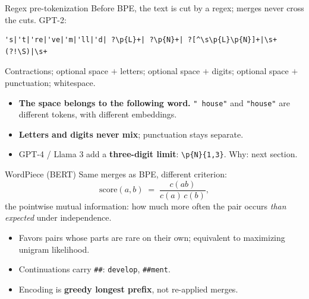 \documentclass[11pt,aspectratio=169]{beamer}
\newcommand{\dest}[1]{\textcolor{structure}{\textbf{#1}}}
\begin{document}
\begin{frame}[fragile]{Regex pre-tokenization}
  Before BPE, the text is cut by a regex; merges never cross the cuts. GPT-2:
\begin{lstlisting}[basicstyle=\ttfamily\scriptsize,frame=single,framerule=0.3pt,rulecolor=\color{gray!50}]
's|'t|'re|'ve|'m|'ll|'d| ?\p{L}+| ?\p{N}+| ?[^\s\p{L}\p{N}]+|\s+(?!\S)|\s+
\end{lstlisting}
  Contractions; optional space $+$ letters; optional space $+$ digits; optional space $+$
  punctuation; whitespace.

  \vspace{0.8em}
  \begin{itemize}
    \item \dest{The space belongs to the following word.} \texttt{" house"} and
          \texttt{"house"} are different tokens, with different embeddings.
    \item \dest{Letters and digits never mix}; punctuation stays separate.
    \item GPT-4 / Llama 3 add a \dest{three-digit limit}: \texttt{\textbackslash p\{N\}\{1,3\}}.
          Why: next section.
  \end{itemize}
\end{frame}

\begin{frame}{WordPiece (BERT)}
  Same merges as BPE, different criterion:
  \[
    \text{score}(a,b) \;=\; \frac{c(ab)}{c(a)\,c(b)} ,
  \]
  the pointwise mutual information: how much more often the pair occurs \emph{than expected}
  under independence.

  \vspace{0.8em}
  \begin{itemize}
    \item Favors pairs whose parts are rare on their own; equivalent to maximizing unigram
          likelihood.
    \item Continuations carry \texttt{\#\#}: \texttt{develop}, \texttt{\#\#ment}.
    \item Encoding is \dest{greedy longest prefix}, not re-applied merges.
  \end{itemize}
\end{frame}
\end{document}
